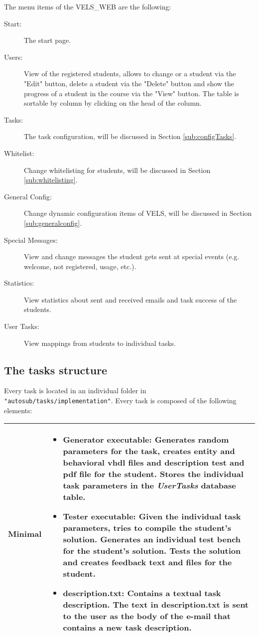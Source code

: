 The menu items of the VELS\_WEB are the following:
\begin{description}
\item [Start:] The start page.
\item [Users:] View of the registered students, allows to change or a student via the
    "Edit" button, delete a student via the "Delete" button  and show the progress of
    a student in the course via the "View" button. The table is sortable by column by
    clicking on the head of the column.
\item [Tasks:] The task configuration, will be discussed in Section \ref{sub:configTasks}.
\item [Whitelist:] Change whitelisting for students, will be discussed in Section
    \ref{sub:whitelisting}.
\item [General Config:] Change dynamic configuration items of VELS, will be discussed in
    Section \ref{sub:generalconfig}.
\item [Special Messages:] View and change messages the student gets sent at special events
    (e.g. welcome, not registered, usage, etc.).
\item [Statistics:] View statistics about sent and received emails and task success of
    the students.
\item [User Tasks:] View mappings from students to individual tasks.
\end{description}


\subsection{The tasks structure} \label{sub:TasksStructure}
Every task is located in an individual folder in {\tt "autosub/tasks/implementation"}. Every task is 
composed of the following elements:

\begin{tabular}{|p{3cm}|p{10cm}|}
\hline

Minimal  & \begin{itemize}
    \item {\bf Generator executable:} Generates random parameters for the task, creates entity 
        and behavioral vhdl files and description test and pdf file for the student. Stores the 
        individual task parameters in the \textit{UserTasks} database table.  
    \item {\bf Tester executable:} Given the individual task parameters, tries to compile the 
        student's solution. Generates an individual test bench for the student's solution. Tests 
        the solution and creates feedback text and files for the student. 
    \item {\bf description.txt:} Contains a textual task description. The text in description.txt 
    	is sent to the user as the body of the e-mail that contains a new task description.
	\end{itemize} 
\\
\hline
\end{tabular}

